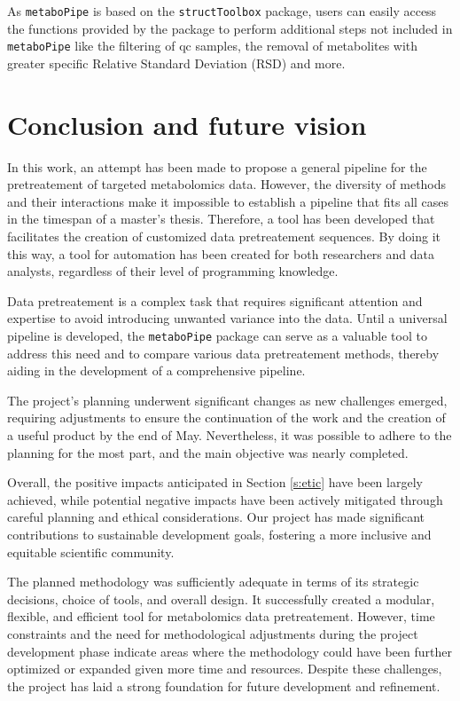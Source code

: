 \documentclass[ENG, BIB]{TFUOC}%
\begin{document}
As \texttt{metaboPipe} is based on the \texttt{structToolbox} package, users can easily access the functions provided by the package to perform additional steps not included in \texttt{metaboPipe} like the filtering of \gls{qc} samples, the removal of metabolites with greater specific Relative Standard Deviation (RSD) and more.




\chapter{Conclusion and future vision}
In this work, an attempt has been made to propose a general pipeline for the pretreatement of targeted metabolomics data. However, the diversity of methods and their interactions make it impossible to establish a pipeline that fits all cases in the timespan of a master's thesis. Therefore, a tool has been developed that facilitates the creation of customized data pretreatement sequences. By doing it this way, a tool for automation has been created for both researchers and data analysts, regardless of their level of programming knowledge.

Data pretreatement is a complex task that requires significant attention and expertise to avoid introducing unwanted variance into the data. Until a universal pipeline is developed, the \texttt{metaboPipe} package can serve as a valuable tool to address this need and to compare various data pretreatement methods, thereby aiding in the development of a comprehensive pipeline.

The project's planning underwent significant changes as new challenges emerged, requiring adjustments to ensure the continuation of the work and the creation of a useful product by the end of May. Nevertheless, it was possible to adhere to the planning for the most part, and the main objective was nearly completed.

Overall, the positive impacts anticipated in Section \ref{s:etic} have been largely achieved, while potential negative impacts have been actively mitigated through careful planning and ethical considerations. Our project has made significant contributions to sustainable development goals, fostering a more inclusive and equitable scientific community.

The planned methodology was sufficiently adequate in terms of its strategic decisions, choice of tools, and overall design. It successfully created a modular, flexible, and efficient tool for metabolomics data pretreatement. However, time constraints and the need for methodological adjustments during the project development phase indicate areas where the methodology could have been further optimized or expanded given more time and resources. Despite these challenges, the project has laid a strong foundation for future development and refinement.
\end{document}
